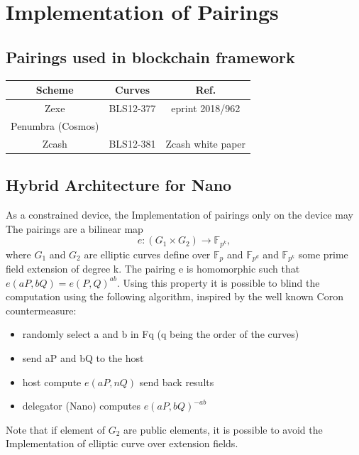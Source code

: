 \documentclass[11pt]{llncs2e/llncs}
\begin{document}
\section{Implementation of Pairings}



\subsection{Pairings used in blockchain framework}

\begin{table}[h!]
\begin{center}
 
\begin{tabular}{|c| c| c|}
\hline
 Scheme & Curves & Ref.\\
 \hline
 Zexe   & BLS12-377 & eprint 2018/962\\
 Penumbra (Cosmos) & &  \\
 \hline
 Zcash & BLS12-381 & Zcash white paper\\
 \hline
\end{tabular}
\end{center}
\end{table}

\subsection{Hybrid Architecture for Nano}
As a constrained device, the Implementation of pairings only on the device may 
The pairings are a bilinear map $$e:(G_1 \times G_2) \rightarrow \mathbb{F}_{p^k}, $$ where $G_1$ and $G_2$ are elliptic curves define over $\mathbb{F}_p$ and $\mathbb{F}_{p^d}$ and $\mathbb{F}_{p^k}$ some prime field extension of degree k. The pairing e is homomorphic such that $e(aP, bQ)=e(P,Q)^{ab}$. Using this property it is possible to blind the computation using the following algorithm, inspired by the well known Coron countermeasure:
\begin{itemize}
 \item randomly select a and b in Fq (q being the order of the curves)
 \item send aP and bQ to the host
\item host compute $e(aP,nQ)$ send back results
\item delegator (Nano) computes $e(aP, bQ)^{-ab}$
\end{itemize}
Note that if element of $G_2$ are public elements, it is possible to avoid the Implementation of elliptic curve over extension fields.
\end{document}
